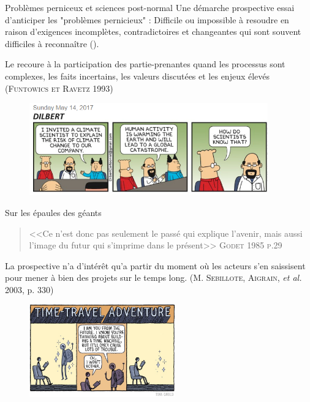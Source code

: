 \documentclass[newPxFont]{beamer}
\begin{document}
\begin{frame}[c]{Problèmes perniceux et sciences post-normal}
  \vspace{-2em}
  Une démarche prospective essai d'anticiper les "problèmes pernicieux" :  Difficile ou impossible à resoudre en raison d'exigences incomplètes, contradictoires et changeantes qui sont souvent difficiles à reconnaître ().

  Le recoure à la participation des partie-prenantes quand les processus sont complexes, les faits incertains, les valeurs discutées et les enjeux élevés (\textsc{Funtowics et Ravetz 1993})

  \begin{figure}
   \includegraphics[height=4cm]{img/a_dilbert-climate-science.png}
  \end{figure}
\end{frame}

\begin{frame}[c]{Sur les épaules des géants}
  \vspace{-2em}
  \begin{quote}
    <<Ce n'est donc pas seulement le passé qui explique l'avenir, mais aussi l'image du futur qui s'imprime dans le présent>>
    \hspace*{\fill}\textsc{Godet 1985 p.29}
  \end{quote}
  La prospective n'a d'intérêt qu'a partir du moment où les acteurs s'en saissisent pour mener à bien des projets sur le temps long. (\textsc{M. Sebillote, Aigrain}, \textit{et al.} 2003, p. 330)
  \begin{figure}
   \includegraphics[height=4cm]{img/a_thom_gauld_futureMachine.jpg}
  \end{figure}
\end{frame}
%
%
\end{document}
